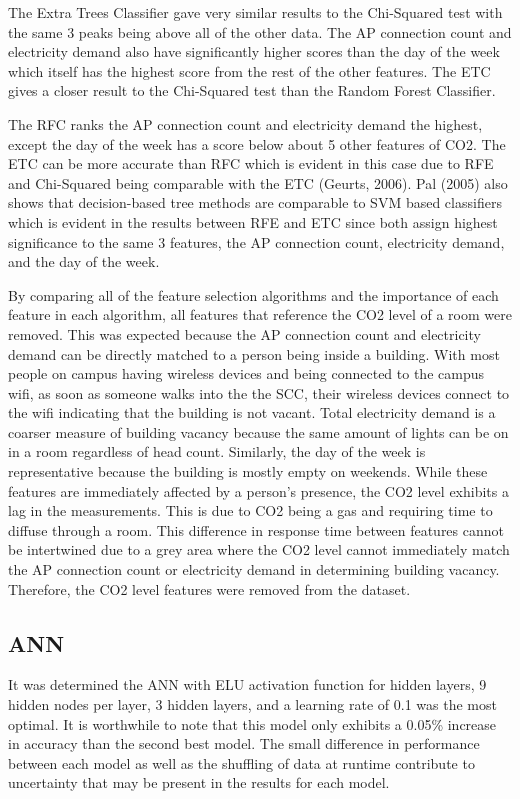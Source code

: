 \documentclass[letterpaper, 12 pt, conference]{ieeeconf}  %
\begin{document}
The Extra Trees Classifier gave very similar results to the Chi-Squared test with the same 3 peaks being above all of the other data. The AP connection count and electricity demand also have significantly higher scores than the day of the week which itself has the highest score from the rest of the other features. The ETC gives a closer result to the Chi-Squared test than the Random Forest Classifier. 

The RFC ranks the AP connection count and electricity demand the highest, except the day of the week has a score below about 5 other features of CO2. The ETC can be more accurate than RFC which is evident in this case due to RFE and Chi-Squared being comparable with the ETC (Geurts, 2006). Pal (2005) also shows that decision-based tree methods are comparable to SVM based classifiers which is evident in the results between RFE and ETC since both assign highest significance to the same 3 features, the AP connection count, electricity demand, and the day of the week.

By comparing all of the feature selection algorithms and the importance of each feature in each algorithm, all features that reference the CO2 level of a room were removed. This was expected because the AP connection count and electricity demand can be directly matched to a person being inside a building. With most people on campus having wireless devices and being connected to the campus wifi, as soon as someone walks into the the SCC, their wireless devices connect to the wifi indicating that the building is not vacant. Total electricity demand is a coarser measure of building vacancy because the same amount of lights can be on in a room regardless of head count. Similarly, the day of the week is representative because the building is mostly empty on weekends. While these features are immediately affected by a person’s presence, the CO2 level exhibits a lag in the measurements. This is due to CO2 being a gas and requiring time to diffuse through a room. This difference in response time between features cannot be intertwined due to a grey area where the CO2 level cannot immediately match the AP connection count or electricity demand in determining building vacancy. Therefore, the CO2 level features were removed from the dataset.



\subsection{ANN}
It was determined the ANN with ELU activation function for hidden layers, 9 hidden nodes per layer, 3 hidden layers, and a learning rate of 0.1 was the most optimal. It is worthwhile to note that this model only exhibits a 0.05\% increase in accuracy than the second best model. The small difference in performance between each model as well as the shuffling of data at runtime contribute to uncertainty that may be present in the results for each model.
\end{document}
